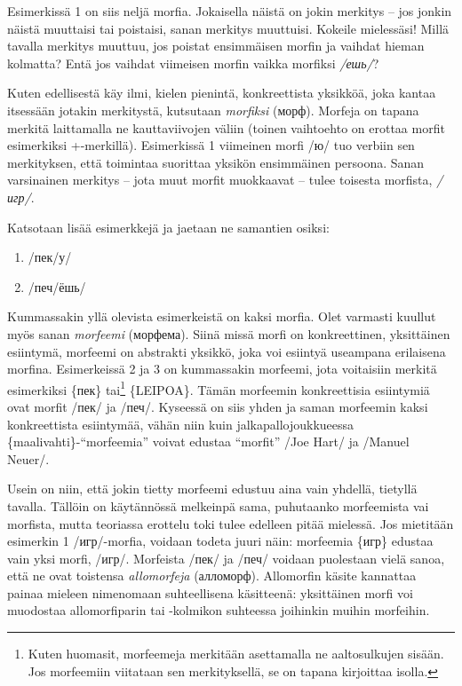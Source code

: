 \documentclass[]{scrreprt}
\providecommand{\tightlist}{%
  \setlength{\itemsep}{0pt}\setlength{\parskip}{0pt}}
\begin{document}
Esimerkissä 1 on siis neljä morfia. Jokaisella näistä on jokin merkitys
-- jos jonkin näistä muuttaisi tai poistaisi, sanan merkitys muuttuisi.
Kokeile mielessäsi! Millä tavalla merkitys muuttuu, jos poistat
ensimmäisen morfin ja vaihdat hieman kolmatta? Entä jos vaihdat
viimeisen morfin vaikka morfiksi \emph{/ешь/}?

Kuten edellisestä käy ilmi, kielen pienintä, konkreettista yksikköä,
joka kantaa itsessään jotakin merkitystä, kutsutaan \emph{morfiksi}
(морф). Morfeja on tapana merkitä laittamalla ne kauttaviivojen väliin
(toinen vaihtoehto on erottaa morfit esimerkiksi +-merkillä).
Esimerkissä 1 viimeinen morfi /ю/ tuo verbiin sen merkityksen, että
toimintaa suorittaa yksikön ensimmäinen persoona. Sanan varsinainen
merkitys -- jota muut morfit muokkaavat -- tulee toisesta morfista,
\emph{/игр/}.

Katsotaan lisää esimerkkejä ja jaetaan ne samantien osiksi:

\begin{enumerate}
\def\labelenumi{(\arabic{enumi})}
\setcounter{enumi}{1}
\tightlist
\item
  /пек/у/
\item
  /печ/ёшь/
\end{enumerate}

Kummassakin yllä olevista esimerkeistä on kaksi morfia. Olet varmasti
kuullut myös sanan \emph{morfeemi} (морфема). Siinä missä morfi on
konkreettinen, yksittäinen esiintymä, morfeemi on abstrakti yksikkö,
joka voi esiintyä useampana erilaisena morfina. Esimerkeissä 2 ja 3 on
kummassakin morfeemi, jota voitaisiin merkitä esimerkiksi \{пек\}
tai\footnote{Kuten huomasit, morfeemeja merkitään asettamalla ne
  aaltosulkujen sisään. Jos morfeemiin viitataan sen merkityksellä, se
  on tapana kirjoittaa isolla.} \{LEIPOA\}. Tämän morfeemin
konkreettisia esiintymiä ovat morfit /пек/ ja /печ/. Kyseessä on siis
yhden ja saman morfeemin kaksi konkreettista esiintymää, vähän niin kuin
jalkapallojoukkueessa \{maalivahti\}-``morfeemia'' voivat edustaa
``morfit'' /Joe Hart/ ja /Manuel Neuer/.

Usein on niin, että jokin tietty morfeemi edustuu aina vain yhdellä,
tietyllä tavalla. Tällöin on käytännössä melkeinpä sama, puhutaanko
morfeemista vai morfista, mutta teoriassa erottelu toki tulee edelleen
pitää mielessä. Jos mietitään esimerkin 1 /игр/-morfia, voidaan todeta
juuri näin: morfeemia \{игр\} edustaa vain yksi morfi, /игр/. Morfeista
/пек/ ja /печ/ voidaan puolestaan vielä sanoa, että ne ovat toistensa
\emph{allomorfeja} (алломорф). Allomorfin käsite kannattaa painaa
mieleen nimenomaan suhteellisena käsitteenä: yksittäinen morfi voi
muodostaa allomorfiparin tai -kolmikon suhteessa joihinkin muihin
morfeihin.
\end{document}
